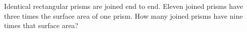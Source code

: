 Identical rectangular prisms are joined end to end. Eleven joined prisms have three times the surface area of one prism. How many joined prisms have nine times that surface area?
